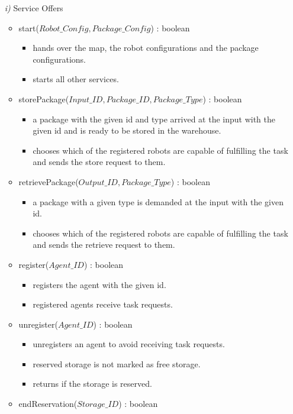 \documentclass{article}
\begin{document}
\begin{enumerate}
	\item[\textit{i)}] Service Offers
	\begin{itemize}
		\item start($Robot\_Config, Package\_Config$) : boolean
		\begin{itemize}
			\item hands over the map, the robot configurations and the package configurations.
			\item starts all other services.
		\end{itemize}
		\item storePackage($Input\_ID, Package\_ID, Package\_Type$) : boolean
		\begin{itemize}
			\item a package with the given id and type arrived at the input with the given id and is ready to be stored in the warehouse.
			\item chooses which of the registered robots are capable of fulfilling the task and sends the store request to them.
		\end{itemize}
		\item retrievePackage($Output\_ID, Package\_Type$) : boolean
		\begin{itemize}
			\item  a package with a given type is demanded at the input with the given id.
			\item chooses which of the registered robots are capable of fulfilling the task and sends the retrieve request to them.
		\end{itemize}
		\item register($Agent\_ID$) : boolean
		\begin{itemize}
			\item registers the agent with the given id.
			\item registered agents receive task requests.
		\end{itemize}
		\item unregister($Agent\_ID$) : boolean
		\begin{itemize}
			\item unregisters an agent to avoid receiving task requests.
			\item reserved storage is not marked as free storage.
			\item returns if the storage is reserved.
		\end{itemize}
		\item endReservation($Storage\_ID$) : boolean

\end{itemize}
\end{enumerate}
\end{document}

